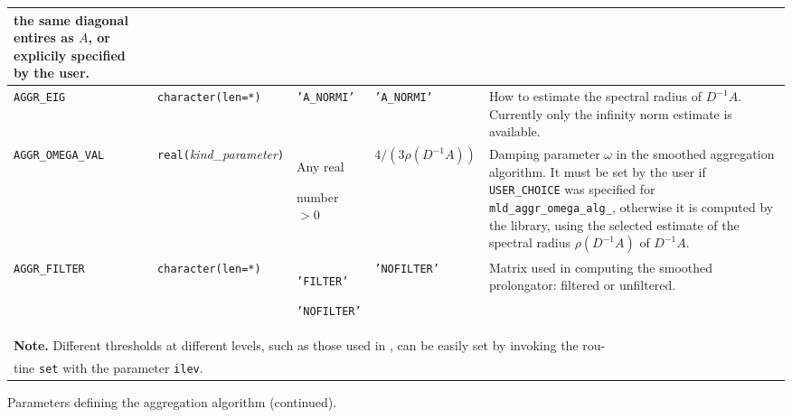\begin{center}
\begin{tabular}{|p{3.8cm}|l|p{2.5cm}|p{2.3cm}|p{6.6cm}|}
                           the same diagonal entires as $A$, or explicily
                           specified by the user. \\ \hline
\verb|AGGR_EIG|    & \verb|character(len=*)|
                         & \texttt{'A\_NORMI'}
                         & \texttt{'A\_NORMI'}
                         & How to estimate the spectral radius of $D^{-1}A$.
                           Currently only the infinity norm estimate
                           is available. \\ \hline
\verb|AGGR_OMEGA_VAL|    & \verb|real(|\emph{kind\_parameter}\verb|)|
                         & Any real \par number $>0$
                         & $4/(3\rho(D^{-1}A))$
                         & Damping parameter $\omega$ in the smoothed aggregation algorithm. 
                           It must be set by the user if
                           \verb|USER_CHOICE| was specified for 
                           \verb|mld_aggr_omega_alg_|,
                           otherwise it is computed by the library, using the
                           selected estimate of the spectral radius $\rho(D^{-1}A)$ of
                           $D^{-1}A$.\\ \hline
\verb|AGGR_FILTER|  
                         & \verb|character(len=*)|
                         & \texttt{'FILTER'} \par \texttt{'NOFILTER'}
                         & \texttt{'NOFILTER'} & Matrix used in computing the smoothed
                            prolongator: filtered or unfiltered. \\
\hline
\multicolumn{5}{|l|}{{\bfseries Note.} Different thresholds at different levels, such as
those used in \cite[Section~5.1]{VANEK_MANDEL_BREZINA}, can be easily set  by 
invoking the rou-} \\
\multicolumn{5}{|l|}{tine \texttt{set} with
the parameter \texttt{ilev}.} \\
\hline
\end{tabular}
\end{center}
\caption{Parameters defining the aggregation algorithm (continued).
\label{tab:p_aggregation_1}} 
\esideways
                     

